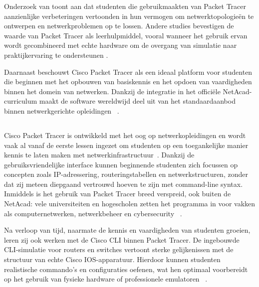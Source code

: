 Onderzoek van \textcite{noor2018} toont aan dat studenten die gebruikmaakten van Packet Tracer aanzienlijke verbeteringen vertoonden in hun vermogen om netwerktopologieën te ontwerpen en netwerkproblemen op te lossen. Andere studies bevestigen de waarde van Packet Tracer als leerhulpmiddel, vooral wanneer het gebruik ervan wordt gecombineerd met echte hardware om de overgang van simulatie naar praktijkervaring te ondersteunen \autocite{runtuwene2024}.

\vspace{0.3cm}

Daarnaast beschouwt Cisco Packet Tracer als een ideaal platform voor studenten die beginnen met het opbouwen van basiskennis en het opdoen van vaardigheden binnen het domein van netwerken. Dankzij de integratie in het officiële NetAcad-curriculum maakt de software wereldwijd deel uit van het standaardaanbod binnen netwerkgerichte opleidingen ~\autocite{packetTracerResources2025}.



\subsection{}%
\label{sec:Gebruik in het onderwijs}

Cisco Packet Tracer is ontwikkeld met het oog op netwerkopleidingen en wordt vaak al vanaf de eerste lessen ingezet om studenten op een toegankelijke manier kennis te laten maken met netwerkinfrastructuur~\autocite{Allison2022}. Dankzij de gebruiksvriendelijke interface kunnen beginnende studenten zich focussen op concepten zoals IP-adressering, routeringstabellen en netwerkstructuren, zonder dat zij meteen diepgaand vertrouwd hoeven te zijn met command-line syntax. Inmiddels is het gebruik van Packet Tracer breed verspreid, ook buiten de NetAcad: vele universiteiten en hogescholen zetten het programma in voor vakken als computernetwerken, netwerkbeheer en cybersecurity ~\autocite{Allison2022}.

\vspace{0.3cm}

Na verloop van tijd, naarmate de kennis en vaardigheden van studenten groeien, leren zij ook werken met de Cisco CLI binnen Packet Tracer. De ingebouwde CLI-simulatie voor routers en switches vertoont sterke gelijkenissen met de structuur van echte Cisco IOS-apparatuur. Hierdoor kunnen studenten realistische commando’s en configuraties oefenen, wat hen optimaal voorbereidt op het gebruik van fysieke hardware of professionele emulatoren ~\autocite{Allison2022}.

